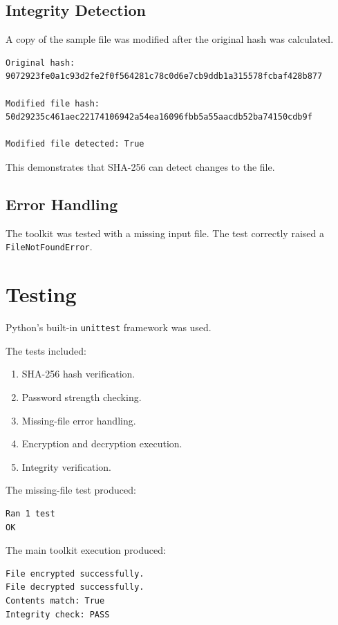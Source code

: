 \documentclass[12pt]{article}
\begin{document}
\subsection{Integrity Detection}

A copy of the sample file was modified after the original hash was calculated.

\begin{verbatim}
Original hash:
9072923fe0a1c93d2fe2f0f564281c78c0d6e7cb9ddb1a315578fcbaf428b877

Modified file hash:
50d29235c461aec22174106942a54ea16096fbb5a55aacdb52ba74150cdb9f

Modified file detected: True
\end{verbatim}

This demonstrates that SHA-256 can detect changes to the file.

\subsection{Error Handling}

The toolkit was tested with a missing input file. The test correctly raised a \texttt{FileNotFoundError}.

\section{Testing}

Python's built-in \texttt{unittest} framework was used.

The tests included:

\begin{enumerate}
\item SHA-256 hash verification.
\item Password strength checking.
\item Missing-file error handling.
\item Encryption and decryption execution.
\item Integrity verification.
\end{enumerate}

The missing-file test produced:

\begin{verbatim}
Ran 1 test
OK
\end{verbatim}

The main toolkit execution produced:

\begin{verbatim}
File encrypted successfully.
File decrypted successfully.
Contents match: True
Integrity check: PASS
\end{verbatim}
\end{document}
